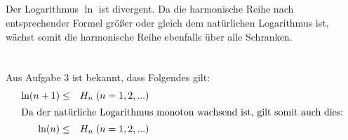 \documentclass[10pt,a4paper,oneside,ngerman,numbers=noenddot]{scrartcl}
\begin{document}
\subsection{} %
Der Logarithmus $\ln$ ist divergent. Da die harmonische Reihe nach entsprechender Formel größer oder gleich dem natürlichen Logarithmus ist, wächst somit die harmonische Reihe ebenfalls über alle Schranken.
\section{} %
\subsection{} %
Aus Aufgabe 3 ist bekannt, dass Folgendes gilt:\\
\begin{alignat*}{2}
\ln(n+1) &\leq & H_{n} \; (n = 1,2,...)\\
\intertext{Da der natürliche Logarithmus monoton wachsend ist, gilt somit auch dies:}
\ln(n) &\leq & H_{n} \; (n = 1,2,...)
\end{alignat*}
\end{document}
